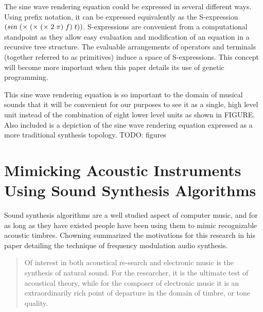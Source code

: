 \documentclass[12pt]{article}
\begin{document}
The sine wave rendering equation could be expressed in several different ways. Using prefix notation, it can be expressed equivalently as the S-expression $\sexp{({sin} (\times (\times (\times 2 \pi) f) t))}$. S-expressions are convenient from a computational standpoint as they allow easy evaluation and modification of an equation in a recursive tree structure. The evaluable arrangements of operators and terminals (together referred to as primitives) induce a space of S-expressions. This concept will become more important when this paper details its use of genetic programming.
	
This sine wave rendering equation is so important to the domain of musical sounds that it will be convenient for our purposes to see it as a single, high level unit instead of the combination of eight lower level units as shown in FIGURE. Also included is a depiction of the sine wave rendering equation expressed as a more traditional synthesis topology. TODO: figures
	
\section{Mimicking Acoustic Instruments Using Sound Synthesis Algorithms}
Sound synthesis algorithms are a well studied aspect of computer music, and for as long as they have existed people have been using them to mimic recognizable acoustic timbres. Chowning summarized the motivations for this research in his paper detailing the technique of frequency modulation audio synthesis.
\begin{quote}
Of interest in both acoustical re-search and electronic music is the synthesis of natural sound. For the researcher, it is the ultimate test of acoustical theory, while for the composer of electronic music it is an extraordinarily rich point of departure in the domain of timbre, or tone quality. \citep{chowning1973synthesis}
\end{quote}
\end{document}
